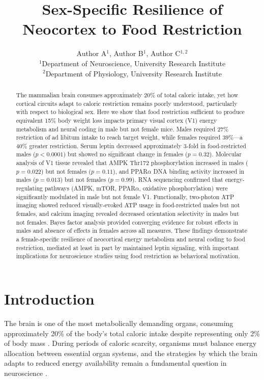 \documentclass[11pt]{article}
\title{Sex-Specific Resilience of Neocortex to Food Restriction}
\author{Author A$^{1}$, Author B$^{1}$, Author C$^{1,2}$ \\
\small $^{1}$Department of Neuroscience, University Research Institute \\
\small $^{2}$Department of Physiology, University Research Institute}
\date{}
\begin{document}
\maketitle

\begin{abstract}
The mammalian brain consumes approximately 20\% of total caloric intake, yet how cortical circuits adapt to caloric restriction remains poorly understood, particularly with respect to biological sex. Here we show that food restriction sufficient to produce equivalent 15\% body weight loss impacts primary visual cortex (V1) energy metabolism and neural coding in male but not female mice. Males required 27\% restriction of ad libitum intake to reach target weight, while females required 39\%---a 40\% greater restriction. Serum leptin decreased approximately 3-fold in food-restricted males ($p < 0.0001$) but showed no significant change in females ($p = 0.32$). Molecular analysis of V1 tissue revealed that AMPK Thr172 phosphorylation increased in males ($p = 0.022$) but not females ($p = 0.11$), and PPAR$\alpha$ DNA binding activity increased in males ($p = 0.013$) but not females ($p = 0.99$). RNA sequencing confirmed that energy-regulating pathways (AMPK, mTOR, PPAR$\alpha$, oxidative phosphorylation) were significantly modulated in male but not female V1. Functionally, two-photon ATP imaging showed reduced visually-evoked ATP usage in food-restricted males but not females, and calcium imaging revealed decreased orientation selectivity in males but not females. Bayes factor analysis provided converging evidence for robust effects in males and absence of effects in females across all measures. These findings demonstrate a female-specific resilience of neocortical energy metabolism and neural coding to food restriction, mediated at least in part by maintained leptin signaling, with important implications for neuroscience studies using food restriction as behavioral motivation.
\end{abstract}

\section{Introduction}

The brain is one of the most metabolically demanding organs, consuming approximately 20\% of the body's total caloric intake despite representing only 2\% of body mass \citep{attwell2001energy, harris2012energetics}. During periods of caloric scarcity, organisms must balance energy allocation between essential organ systems, and the strategies by which the brain adapts to reduced energy availability remain a fundamental question in neuroscience \citep{food_restriction_neuro2018}.
\end{document}
